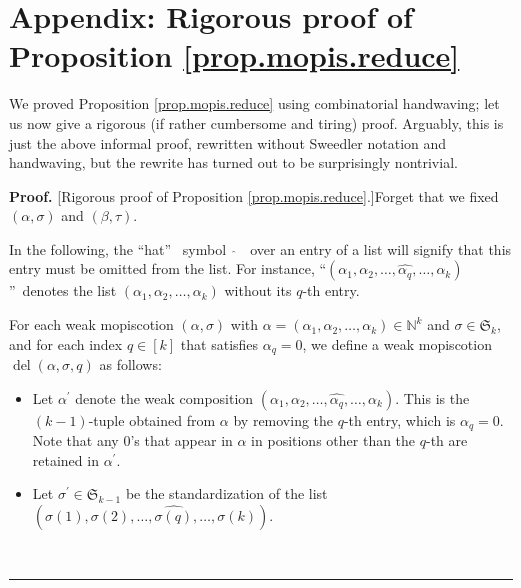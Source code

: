 \documentclass[numbers=enddot,12pt,final,onecolumn,notitlepage]{scrartcl}%
\theoremstyle{definition}
\newenvironment{fineprint}{\begin{small}}{\end{small}}
\newenvironment{proof}[1][Proof]{\noindent\textbf{#1.} }{\ \rule{0.5em}{0.5em}}
\begin{document}
\appendix



\section{\label{sec.pas-proof}Appendix: Rigorous proof of Proposition
\ref{prop.mopis.reduce}}

\begin{fineprint}
We proved Proposition \ref{prop.mopis.reduce} using combinatorial handwaving;
let us now give a rigorous (if rather cumbersome and tiring) proof. Arguably,
this is just the above informal proof, rewritten without Sweedler notation and
handwaving, but the rewrite has turned out to be surprisingly nontrivial.

\begin{proof}
[Rigorous proof of Proposition \ref{prop.mopis.reduce}.]Forget that we fixed
$\left(  \alpha,\sigma\right)  $ and $\left(  \beta,\tau\right)  $.

In the following, the \textquotedblleft hat\textquotedblright%
\ symbol\ $\ \widehat{}$\ \ over an entry of a list will signify that this
entry must be omitted from the list. For instance, \textquotedblleft$\left(
\alpha_{1},\alpha_{2},\ldots,\widehat{\alpha_{q}},\ldots,\alpha_{k}\right)
$\textquotedblright\ denotes the list $\left(  \alpha_{1},\alpha_{2}%
,\ldots,\alpha_{k}\right)  $ without its $q$-th entry.

For each weak mopiscotion $\left(  \alpha,\sigma\right)  $ with $\alpha
=\left(  \alpha_{1},\alpha_{2},\ldots,\alpha_{k}\right)  \in\mathbb{N}^{k}$
and $\sigma\in\mathfrak{S}_{k}$, and for each index $q\in\left[  k\right]  $
that satisfies $\alpha_{q}=0$, we define a weak mopiscotion
$\operatorname*{del}\left(  \alpha,\sigma,q\right)  $ as follows:

\begin{itemize}
\item Let $\alpha^{\prime}$ denote the weak composition $\left(  \alpha
_{1},\alpha_{2},\ldots,\widehat{\alpha_{q}},\ldots,\alpha_{k}\right)  $. This
is the $\left(  k-1\right)  $-tuple obtained from $\alpha$ by removing the
$q$-th entry, which is $\alpha_{q}=0$. Note that any $0$'s that appear in
$\alpha$ in positions other than the $q$-th are retained in $\alpha^{\prime}$.

\item Let $\sigma^{\prime}\in\mathfrak{S}_{k-1}$ be the standardization of the
list $\left(  \sigma\left(  1\right)  ,\sigma\left(  2\right)  ,\ldots
,\widehat{\sigma\left(  q\right)  },\ldots,\sigma\left(  k\right)  \right)  $.


\end{itemize}
\end{proof}
\end{fineprint}
\end{document}
